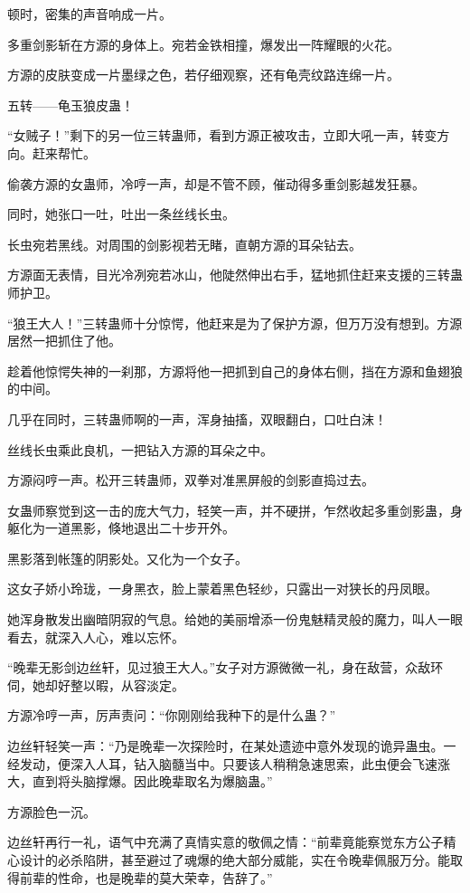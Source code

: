 \begin{this_body}
顿时，密集的声音响成一片。

多重剑影斩在方源的身体上。宛若金铁相撞，爆发出一阵耀眼的火花。

方源的皮肤变成一片墨绿之色，若仔细观察，还有龟壳纹路连绵一片。

五转——龟玉狼皮蛊！

“女贼子！”剩下的另一位三转蛊师，看到方源正被攻击，立即大吼一声，转变方向。赶来帮忙。

偷袭方源的女蛊师，冷哼一声，却是不管不顾，催动得多重剑影越发狂暴。

同时，她张口一吐，吐出一条丝线长虫。

长虫宛若黑线。对周围的剑影视若无睹，直朝方源的耳朵钻去。

方源面无表情，目光冷冽宛若冰山，他陡然伸出右手，猛地抓住赶来支援的三转蛊师护卫。

“狼王大人！”三转蛊师十分惊愕，他赶来是为了保护方源，但万万没有想到。方源居然一把抓住了他。

趁着他惊愕失神的一刹那，方源将他一把抓到自己的身体右侧，挡在方源和鱼翅狼的中间。

几乎在同时，三转蛊师啊的一声，浑身抽搐，双眼翻白，口吐白沫！

丝线长虫乘此良机，一把钻入方源的耳朵之中。

方源闷哼一声。松开三转蛊师，双拳对准黑屏般的剑影直捣过去。

女蛊师察觉到这一击的庞大气力，轻笑一声，并不硬拼，乍然收起多重剑影蛊，身躯化为一道黑影，倏地退出二十步开外。

黑影落到帐篷的阴影处。又化为一个女子。

这女子娇小玲珑，一身黑衣，脸上蒙着黑色轻纱，只露出一对狭长的丹凤眼。

她浑身散发出幽暗阴寂的气息。给她的美丽增添一份鬼魅精灵般的魔力，叫人一眼看去，就深入人心，难以忘怀。

“晚辈无影剑边丝轩，见过狼王大人。”女子对方源微微一礼，身在敌营，众敌环伺，她却好整以暇，从容淡定。

方源冷哼一声，厉声责问：“你刚刚给我种下的是什么蛊？”

边丝轩轻笑一声：“乃是晚辈一次探险时，在某处遗迹中意外发现的诡异蛊虫。一经发动，便深入人耳，钻入脑髓当中。只要该人稍稍急速思索，此虫便会飞速涨大，直到将头脑撑爆。因此晚辈取名为爆脑蛊。”

方源脸色一沉。

边丝轩再行一礼，语气中充满了真情实意的敬佩之情：“前辈竟能察觉东方公子精心设计的必杀陷阱，甚至避过了魂爆的绝大部分威能，实在令晚辈佩服万分。能取得前辈的性命，也是晚辈的莫大荣幸，告辞了。”


\end{this_body}
